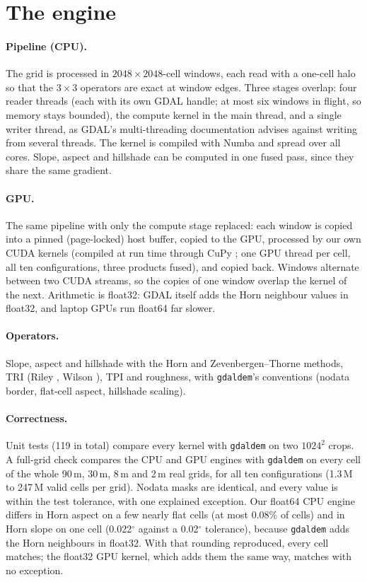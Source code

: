 ﻿\documentclass[11pt,a4paper]{article}
\begin{document}
\section{The engine}
\paragraph{Pipeline (CPU).} The grid is processed in $2048\times2048$-cell windows, each read with a one-cell halo so
that the $3\times3$ operators are exact at window edges. Three stages overlap: four reader threads (each with its own
GDAL handle; at most six windows in flight, so memory stays bounded), the compute kernel in the main thread, and a
single writer thread, as GDAL's multi-threading documentation advises against writing from several threads. The
kernel is compiled with Numba \cite{numba} and spread over all cores. Slope, aspect and hillshade can be computed in
one fused pass, since they share the same gradient.

\paragraph{GPU.} The same pipeline with only the compute stage replaced: each window is copied into a pinned
(page-locked) host buffer, copied to the GPU, processed by our own CUDA kernels (compiled at run time through CuPy
\cite{cupy}; one GPU thread per cell, all ten configurations, three products fused), and copied back. Windows
alternate between two CUDA streams, so the copies of one window overlap the kernel of the next. Arithmetic is
float32: GDAL itself adds the Horn neighbour values in float32, and laptop GPUs run float64 far slower.

\paragraph{Operators.} Slope, aspect and hillshade with the Horn \cite{horn} and Zevenbergen--Thorne \cite{zt}
methods, TRI (Riley \cite{riley}, Wilson \cite{wilson}), TPI and roughness, with \texttt{gdaldem}'s conventions
(nodata border, flat-cell aspect, hillshade scaling).

\paragraph{Correctness.} Unit tests (119 in total) compare every kernel with \texttt{gdaldem} on two $1024^2$ crops.
A full-grid check compares the CPU and GPU engines with \texttt{gdaldem} on every cell of the whole 90\,m, 30\,m,
8\,m and 2\,m real grids, for all ten configurations (1.3\,M to 247\,M valid cells per grid). Nodata masks are
identical, and every value is within the test tolerance, with one explained exception. Our float64 CPU engine
differs in Horn aspect on a few nearly flat cells (at most 0.08\% of cells) and in Horn slope on one cell (0.022$^\circ$
against a 0.02$^\circ$ tolerance), because \texttt{gdaldem} adds the Horn neighbours in float32. With that rounding reproduced, every cell matches; the float32 GPU kernel, which adds them
the same way, matches with no exception.
\end{document}

